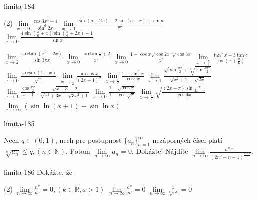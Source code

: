 \begin{defproblem}{limita-184}
\begin{tasks}(2)
    \task $\lim\limits_{x \rightarrow 0} \frac{\cos 3x^3-1}{\sin ^6 2x}$
    \task $\lim\limits_{x \rightarrow 0} \frac{\sin (a+2x)-2\sin (a+x)+\sin a}{x^2}$
    \task $\lim\limits_{x \rightarrow 0} \frac{4\sin (\frac{\pi}{6}+x)\sin (\frac{\pi}{6}+2x)-1}{\sin x}$

    \task $\lim\limits_{x \rightarrow 2} \frac{\arctan (x^2-2x)}{\sin 3\pi x}$
    \task $\lim\limits_{x \rightarrow 0} \frac{\arctan \frac{1}{x}+2}{x^2}$
    \task $\lim\limits_{x \rightarrow 0} \frac{1-\cos x\sqrt{\cos 2x}\sqrt[3]{\cos 3x}}{x^2}$
    \task $\lim\limits_{x \rightarrow \frac{\pi}{3}} \frac{\tan^3 x-3 \tan c}{\cos (x+\frac{\pi}{6})}$
    \task $\lim\limits_{x \rightarrow 0} \frac{\arcsin (1-x)}{\sqrt{x}}$
    \task $\lim\limits_{x \rightarrow \frac{1}{2}} \frac{\arccos x}{(2x-1)^2}$
    \task $\lim\limits_{x \rightarrow \frac{\pi}{2}} \frac{1-\sin ^3 x}{\cos ^2 x}$
    \task $\lim\limits_{x \rightarrow 1} \frac{\sqrt{\sin \frac{\pi x}{2}}+\sqrt[3]{\sin \frac{3\pi x}{2}}}{\sqrt{x^2+1}-\sqrt{2x}}$
    \task $\lim\limits_{x \rightarrow 1} \frac{\cos \frac{\pi x}{2}}{x-1}\cdot \frac{\sqrt{x+3}-2}{\sqrt{x^3+3x}-\sqrt{3x^2+1}}$
    \task $\lim\limits_{x \rightarrow 0} \frac{1-\sqrt{\cos x}}{1-\cos \sqrt{x}}$
    \task $\lim\limits_{x \rightarrow \frac{\pi}{2}} \sqrt{\frac{(2x-\pi)\sin \frac{\pi}{2x-\pi}}{\cos 4x}}$
    \task $\lim\limits_{x \rightarrow \infty} (\sin \ln (x+1)-\sin \ln x)$
\end{tasks}
\end{defproblem}

\begin{defproblem}{limita-185}
\begin{tasks}
\task Nech $q \in (0,1)$, nech pre postupnosť ${\{a_n\}}_{n=1}^\infty$ nezáporných čísel platí $\sqrt[n]{a_n}\leq q,(n \in \mathbb{N})$. Potom $\lim\limits_{n \rightarrow \infty} a_n=0$. Dokážte!
\task Nájdite $\lim\limits_{n \rightarrow \infty}\frac{n^{n-1}}{(2n^2+n+1)^{\frac{n+1}{2}}}$.
\end{tasks}
\end{defproblem}

\begin{defproblem}{limita-186}
Dokážte, že
\begin{tasks}(2)
\task $\lim\limits_{n \rightarrow \infty} \frac{n^k}{a^n}=0,(k \in \mathbb{R},a>1)$
\task $\lim\limits_{n \rightarrow \infty} \frac{a^n}{n!}=0$
\task $\lim\limits_{n \rightarrow \infty} \frac{1}{\sqrt[n]{n!}}=0$
\end{tasks}
\end{defproblem}

